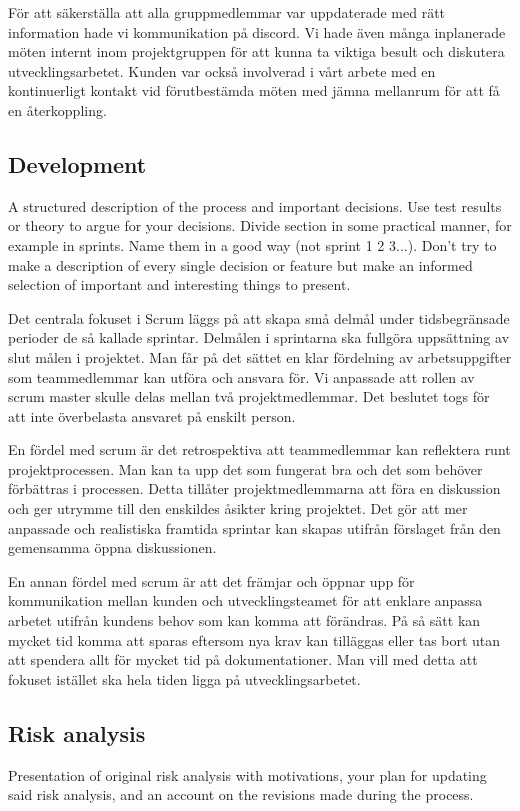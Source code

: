 \documentclass[12pt]{article}
\begin{document}
För att säkerställa att alla gruppmedlemmar var uppdaterade med rätt information hade vi kommunikation på discord. Vi hade även många inplanerade möten internt inom projektgruppen för att kunna ta viktiga besult och diskutera utvecklingsarbetet. Kunden var också involverad i vårt arbete med en kontinuerligt kontakt vid förutbestämda möten med jämna mellanrum för att få en återkoppling.  


\subsection{Development}
A structured description of the process and important decisions. Use test results or theory to argue for your decisions. Divide section in some practical manner, for example in sprints. Name them in a good way (not sprint 1 2 3...). Don’t try to make a description of every single decision or feature but make an informed selection of important and interesting things to present.


Det centrala fokuset i Scrum läggs på att skapa små delmål under tidsbegränsade perioder de så kallade sprintar. Delmålen i sprintarna ska fullgöra uppsättning av slut målen i projektet. Man får på det sättet en klar fördelning av arbetsuppgifter som teammedlemmar kan utföra och ansvara för. Vi anpassade att rollen av scrum master skulle delas mellan två projektmedlemmar. Det beslutet togs för att inte överbelasta ansvaret på enskilt person. 

En fördel med scrum är det retrospektiva att teammedlemmar kan reflektera runt projektprocessen. Man kan ta upp det som fungerat bra och det som behöver förbättras i processen. Detta tillåter projektmedlemmarna att föra en diskussion och ger utrymme till den enskildes åsikter kring projektet. Det gör att mer anpassade och realistiska framtida sprintar kan skapas utifrån förslaget från den gemensamma öppna diskussionen. 

En annan fördel med scrum är att det främjar och öppnar upp för kommunikation mellan kunden och utvecklingsteamet för att enklare anpassa arbetet utifrån kundens behov som kan komma att förändras. På så sätt kan mycket tid komma att sparas eftersom nya krav kan tilläggas eller tas bort utan att spendera allt för mycket tid på dokumentationer. Man vill med detta att fokuset istället ska hela tiden ligga på utvecklingsarbetet. 

\subsection{Risk analysis}
Presentation of original risk analysis with motivations, your plan for updating said risk analysis, and an account on the revisions made during the process.
\end{document}
